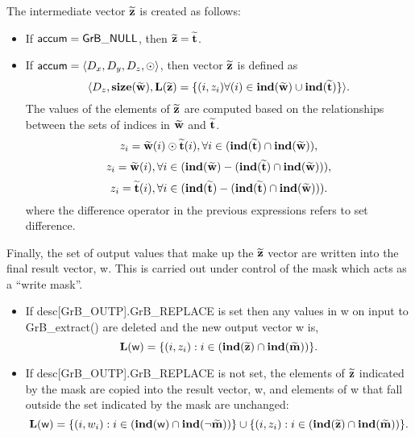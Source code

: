 The intermediate vector ${\bf \widetilde{z}}$ is created as follows:
\begin{itemize}
    \item If ${\sf accum} = {\sf GrB\_NULL}$, then ${\bf \widetilde{z}} = {\bf \widetilde{t}}$.

    \item If ${\sf accum} = \langle D_x, D_y, D_z, \odot \rangle$, then vector ${\bf \widetilde{z}}$ is defined as 
        \[ \langle D_z, \bold{size}({\bf \widetilde{w}}), \bold{L}({\bf \widetilde{z}})
		= \{(i,z_{i})  \forall (i) \in \bold{ind}({\bf \widetilde{w}}) \cup 
        \bold{ind}({\bf \widetilde{t}}) \} \rangle.\]
    The values of the elements of ${\bf \widetilde{z}}$ are computed based on the relationships between the sets of indices in ${\bf \widetilde{w}}$ and ${\bf \widetilde{t}}$.
\[
z_{i} = {\bf \widetilde{w}}(i) \odot {\bf \widetilde{t}}(i), \forall i \in  (\bold{ind}({\bf \widetilde{t}}) \cap \bold{ind}({\bf \widetilde{w}})),
\]
\[
z_{i} = {\bf \widetilde{w}}(i), \forall  i \in  (\bold{ind}({\bf \widetilde{w}}) - (\bold{ind}({\bf \widetilde{t}}) \cap \bold{ind}({\bf \widetilde{w}}))),
\]
\[
z_{i} = {\bf \widetilde{t}}(i), \forall  i \in  (\bold{ind}({\bf \widetilde{t}}) - (\bold{ind}({\bf \widetilde{t}}) \cap \bold{ind}({\bf \widetilde{w}}))).
\]
where the difference operator in the previous expressions refers to set difference.
\end{itemize}

Finally, the set of output values that make up the ${\bf \widetilde{z}}$ 
vector are written into the final result vector, {\sf w}. 
This is carried out under control of the mask which acts as a ``write mask''.
\begin{itemize}
\item If {\sf desc[GrB\_OUTP].GrB\_REPLACE} is set then any values in {\sf w} 
on input to {\sf GrB\_extract()} are deleted and the new output vector {\sf w} is,
\[ \bold{L}({\sf w}) = \{(i,z_{i}) : i \in (\bold{ind}({\bf \widetilde{z}}) 
\cap \bold{ind}({\bf \widetilde{m}})) \}. \]

\item If {\sf desc[GrB\_OUTP].GrB\_REPLACE} is not set, the elements of 
${\bf \widetilde{z}}$ indicated by 
the mask are copied into the result vector, {\sf w}, and elements of 
{\sf w} that fall outside the set indicated by the mask are unchanged:
\[ \bold{L}({\sf w}) = \{(i,w_{i}) : i \in (\bold{ind}({\sf w}) 
\cap \bold{ind}(\neg {\bf \widetilde{m}})) \} \cup \{(i,z_{i}) : i \in 
(\bold{ind}({\bf \widetilde{z}}) \cap \bold{ind}({\bf \widetilde{m}})) \}. \]
\end{itemize}

